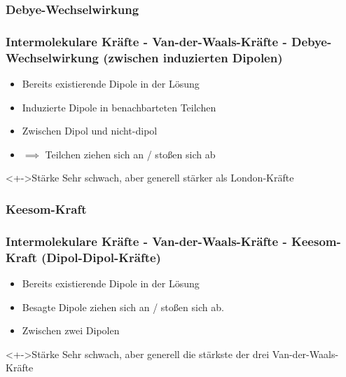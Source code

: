 \subsubsection{Debye-Wechselwirkung}
\begin{frame}
\frametitle{Intermolekulare Kräfte - Van-der-Waals-Kräfte - Debye-Wechselwirkung (zwischen induzierten Dipolen)}
\begin{itemize}
	\item<+-> Bereits existierende Dipole in der Lösung
	\item<+-> Induzierte Dipole in benachbarteten Teilchen
	\item<+-> Zwischen Dipol und nicht-dipol
	\item<+-> $\implies$ Teilchen ziehen sich an / stoßen sich ab
\end{itemize}
\begin{block}<+->{Stärke}
	Sehr schwach, aber generell stärker als London-Kräfte
\end{block}

\end{frame}

\subsubsection{Keesom-Kraft}
\begin{frame}
\frametitle{Intermolekulare Kräfte - Van-der-Waals-Kräfte - Keesom-Kraft (Dipol-Dipol-Kräfte)}
\begin{itemize}
	\item<+-> Bereits existierende Dipole in der Lösung
	\item<+-> Besagte Dipole ziehen sich an / stoßen sich ab.
	\item<+-> Zwischen zwei Dipolen
\end{itemize}
\begin{block}<+->{Stärke}
	Sehr schwach, aber generell die stärkste der drei Van-der-Waals-Kräfte
\end{block}
\end{frame}


